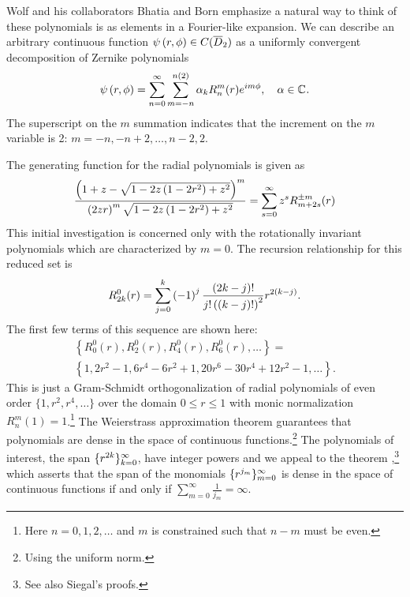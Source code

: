 \documentclass[preprint,12pt]{elsarticle}
\begin{document}
Wolf and his collaborators Bhatia \cite{Wolf} and Born \cite{BW} emphasize a natural way to think of these polynomials is as elements in a Fourier-like expansion. We can describe an arbitrary continuous function $\psi\left( r, \phi \right)\in C(\overline{D}_{2})$ as a uniformly convergent decomposition of Zernike polynomials
\begin{equation}
  \psi\left( r, \phi \right) = \sum_{n=0}^{\infty}\sum_{m=-n}^{n(2)} \alpha_{k} R_{n}^{m}(r) e^{i m \phi}, \quad \alpha\in\mathbb{C}^{} .
\end{equation}
The superscript on the $m$ summation indicates that the increment on the $m$ variable is 2: $m = -n, -n+2, \dots, n-2, 2$.

The generating function for the radial polynomials is given as \cite[p. 525]{BW}
\begin{equation}
  \frac{\left( 1+z-\sqrt{1-2z\left( 1-2r^{2} \right)+z^{2}} \right)^{m}} {\left( 2zr \right)^{m} \sqrt{1-2z\left( 1-2r^{2} \right)+z^{2}}} = \sum_{s=0}^{\infty} z^{s} R_{m+2s}^{\pm m}(r)
  \label{eq:zernikegen}
\end{equation}
This initial investigation is concerned only with the rotationally invariant polynomials which are characterized by $m=0$. The recursion relationship for this reduced set is
\begin{equation}
  R_{2k}^{0}(r) = \sum_{j=0}^{k}{\left( -1 \right)^j\frac{(2k-j)!}{j!\left( \left( k-j \right)! \right)^{2}}r^{2(k-j)}} .
  \label{eq:reduced}
\end{equation}
The first few terms of this sequence are shown here:
\begin{multline}
\left\{ R_{0}^{0}(r),  R_{2}^{0}(r),  R_{4}^{0}(r),  R_{6}^{0}(r), \dots \right\} = \\
  \left\{1, 2r^2-1, 6r^4-6 r^2+1, 20r^6-30 r^4 + 12 r^2-1, \dots \right\}.
\end{multline}
This is just a Gram-Schmidt orthogonalization of radial polynomials of even order $\{1,r^{2},r^{4},\dots\}$ over the domain $0\le r\le1$ with monic normalization $R_{n}^{m}(1)=1$.\footnote{Here $n=0,1,2,\dots$ and $m$ is constrained such that $n-m$ must be even.} The Weierstrass approximation theorem guarantees that polynomials are dense in the space of continuous functions.\footnote{Using the uniform norm.} The polynomials of interest, the span $\lbrace r^{2k} \rbrace_{k=0}^{\infty}$, have integer powers and we appeal to the \mst theorem \cite[p. 88]{Lax},\footnote{See also Siegal's \cite{Siegal} proofs.} which asserts that the span of the monomials $\lbrace r^{j_{m}} \rbrace_{m=0}^{\infty}$ is dense in the space of continuous functions if and only if $\sum_{m=0}^{\infty}\frac{1}{j_{m}} = \infty$.
\end{document}
